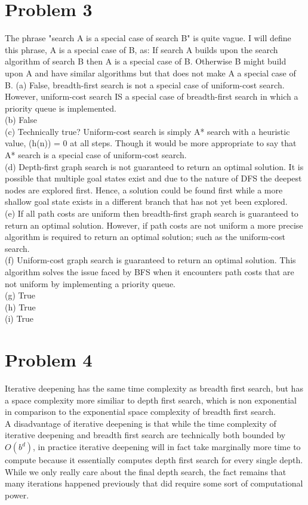 \documentclass[12pt]{article}
\begin{document}
\section *{Problem 3}
The phrase "search A is a special case of search B" is quite vague. I will define this phrase, A is a special case of B, as: If search A builds upon the search algorithm of search B then A is a special case of B. Otherwise B might build upon A and have similar algorithms but that does not make A a special case of B.
(a) False, breadth-first search is not a special case of uniform-cost search. However, uniform-cost search IS a special case of breadth-first search in which a priority queue is implemented. \\
(b) False\\
(c) Technically true? Uniform-cost search is simply A* search with a heuristic value, (h(n)) = 0 at all steps. Though it would be more appropriate to say that A* search is a special case of uniform-cost search.\\
(d) Depth-first graph search is not guaranteed to return an optimal solution. It is possible that multiple goal states exist and due to the nature of DFS the deepest nodes are explored first. Hence, a solution could be found first while a more shallow goal state exists in a different branch that has not yet been explored.\\
(e) If all path costs are uniform then breadth-first graph search is guaranteed to return an optimal solution. However, if path costs are not uniform a more precise algorithm is required to return an optimal solution; such as the uniform-cost search.\\
(f) Uniform-cost graph search is guaranteed to return an optimal solution. This algorithm solves the issue faced by BFS when it encounters path costs that are not uniform by implementing a priority queue.\\
(g) True\\
(h) True\\
(i) True \\




\section *{Problem 4}
Iterative deepening has the same time complexity as breadth first search, but has a space complexity more similiar to depth first search, which is non exponential in comparison to the exponential space complexity of breadth first search. \\
A disadvantage of iterative deepening is that while the time complexity of iterative deepening and breadth first search are technically both bounded by $O(b^d)$, in practice iterative deepening will in fact take marginally more time to compute because it essentially computes depth first search for every single depth. While we only really care about the final depth search, the fact remains that many iterations happened previously that did require some sort of computational power. \newpage
\end{document}
